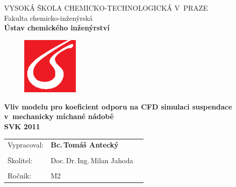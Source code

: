 \begin{center}
{\Large VYSOKÁ ŠKOLA CHEMICKO-TECHNOLOGICKÁ V~PRAZE\\}
{\large Fakulta chemicko-inženýrská\\
\textbf{Ústav chemického inženýrství}\\}
\vspace{15mm}

\begin{figure}[!h]
\begin{center}
\includegraphics[angle=0,width=27mm]{images/logo_vscht.eps}
\end{center}
\end{figure}

\vspace{25mm}

{\LARGE \textbf{Vliv modelu pro koeficient odporu na CFD simulaci suspendace v~mechanicky míchané nádobě\\}}
\vspace{10mm}
{\Large \textbf{SVK 2011\\}}
\end{center}
\vspace{35mm}

\null
\vfill

\begin{tabular}{p{30mm}lp{50mm}}
Vypracoval: & \textbf{Bc.\,Tomáš Antecký}\\
\\
Školitel: & Doc.\,Dr.\,Ing.\,Milan Jahoda \\
\\
Ročník: & M2 \\


\end{tabular}
